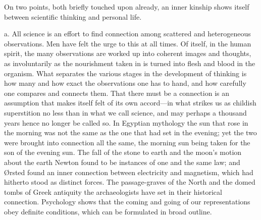 \documentclass[12pt,a4paper]{article}
\newcommand{\opage}[1]{\marginnote{\footnotesize\textit{[#1]}}}
\begin{document}
\medskip

On two points, both briefly touched upon already, an inner kinship shows itself
between scientific thinking and personal life.

a. All science is an effort to find connection among scattered and heterogeneous
observations. Men have felt the urge to this at all times. Of itself, in the human
spirit, the many observations are worked up into coherent images and thoughts, as
involuntarily as the nourishment taken in is turned into flesh and blood in the
organism. What separates the various stages in the development of thinking is how
many and how exact the observations one has to hand, and how carefully one compares
and connects them. That there must be a connection is an assumption that makes
itself felt of its own accord---in what strikes us as childish superstition no less
than in what we call science, and may perhaps a thousand years hence no longer be
called so. In Egyptian mythology the sun that rose in the morning was not the same
as the one that had set in the evening; yet the two were brought into connection all
the same, the morning sun being taken for the son of the evening sun. The fall of
the stone to earth and the moon's motion about the earth Newton found to be
instances of one and the same law; and Ørsted found an inner connection between
electricity and magnetism, which had hitherto stood as distinct forces. The
passage-graves of the North and the domed tombs of Greek antiquity the archaeologists
have set in their historical connection. Psychology shows that the \opage{40}coming and going
of our representations obey definite conditions, which can be formulated in broad
outline.
\end{document}
